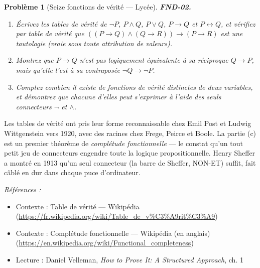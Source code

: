 \documentclass[11pt]{article}
\newtheorem{problem}{Problème}
\newenvironment{refs}{\par\small\noindent\emph{Références :}\begin{itemize}\setlength\itemsep{0pt}}{\end{itemize}\normalsize}
\begin{document}
\bigskip

\begin{problem}[{Seize fonctions de vérité --- Lycée}]
\textbf{FND-02.} \begin{enumerate}
\item[(a)] Écrivez les tables de vérité de $ \neg P $,
$ P \wedge Q $, $ P \vee Q $, $ P \to Q $ et $ P \leftrightarrow Q $, et vérifiez par
table de vérité que $ ((P \to Q) \wedge (Q \to R)) \to (P \to R) $ est une tautologie (vraie
sous toute attribution de valeurs).
\item[(b)] Montrez que $ P \to Q $ n'est \textit{pas} logiquement équivalente à sa
réciproque $ Q \to P $, mais qu'elle l'\textit{est} à sa contraposée
$ \neg Q \to \neg P $.
\item[(c)] Comptez combien il existe de fonctions de vérité distinctes de deux variables,
et démontrez que chacune d'elles peut s'exprimer à l'aide des seuls connecteurs $ \neg $
et $ \wedge $.
\end{enumerate}

\end{problem}

\noindent Les tables de vérité ont pris leur forme reconnaissable chez Emil Post et
Ludwig Wittgenstein vers 1920, avec des racines chez Frege, Peirce et Boole. La partie (c) est un
premier théorème de \textit{complétude fonctionnelle} --- le constat qu'un tout petit jeu de
connecteurs engendre toute la logique propositionnelle. Henry Sheffer a montré en 1913 qu'un seul
connecteur (la barre de Sheffer, NON-ET) suffit, fait câblé en dur dans chaque puce
d'ordinateur.

\begin{refs}
\item Contexte : Table de vérité --- Wikipédia (\url{https://fr.wikipedia.org/wiki/Table_de_v%C3%A9rit%C3%A9})
\item Contexte : Complétude fonctionnelle --- Wikipédia (en anglais) (\url{https://en.wikipedia.org/wiki/Functional_completeness})
\item Lecture : Daniel Velleman, \textit{How to Prove It: A Structured Approach}, ch. 1
\end{refs}

\bigskip
\end{document}
